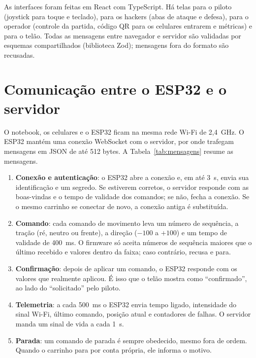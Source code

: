 \documentclass[12pt,openright,oneside,a4paper,english,brazil]{abntex2}
\begin{document}
As interfaces foram feitas em React com TypeScript. Há telas para o piloto (joystick para toque e teclado), para os hackers (abas de ataque e defesa), para o operador (controle da partida, código QR para os celulares entrarem e métricas) e para o telão. Todas as mensagens entre navegador e servidor são validadas por esquemas compartilhados (biblioteca Zod); mensagens fora do formato são recusadas.

\section{Comunicação entre o ESP32 e o servidor}

O notebook, os celulares e o ESP32 ficam na mesma rede Wi-Fi de 2,4~GHz. O ESP32 mantém uma conexão WebSocket com o servidor, por onde trafegam mensagens em JSON de até 512 bytes. A Tabela~\ref{tab:mensagens} resume as mensagens.

\begin{enumerate}
  \item \textbf{Conexão e autenticação}: o ESP32 abre a conexão e, em até 3~s, envia sua identificação e um segredo. Se estiverem corretos, o servidor responde com as boas-vindas e o tempo de validade dos comandos; se não, fecha a conexão. Se o mesmo carrinho se conectar de novo, a conexão antiga é substituída.
  \item \textbf{Comando}: cada comando de movimento leva um número de sequência, a tração (ré, neutro ou frente), a direção ($-100$ a $+100$) e um tempo de validade de 400~ms. O firmware só aceita números de sequência maiores que o último recebido e valores dentro da faixa; caso contrário, recusa e para.
  \item \textbf{Confirmação}: depois de aplicar um comando, o ESP32 responde com os valores que realmente aplicou. É isso que o telão mostra como \enquote{confirmado}, ao lado do \enquote{solicitado} pelo piloto.
  \item \textbf{Telemetria}: a cada 500~ms o ESP32 envia tempo ligado, intensidade do sinal Wi-Fi, último comando, posição atual e contadores de falhas. O servidor manda um sinal de vida a cada 1~s.
  \item \textbf{Parada}: um comando de parada é sempre obedecido, mesmo fora de ordem. Quando o carrinho para por conta própria, ele informa o motivo.
\end{enumerate}
\end{document}

